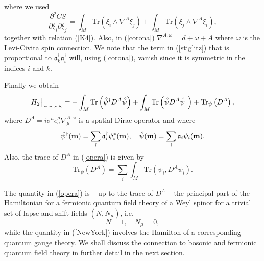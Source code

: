 \documentclass[12pt]{article}
\def\m{\mu}
\def\n{\nu}
\def\oo{\omega}
\newcommand{\pa}{\partial}
\begin{document}
where we used 
$$
 \frac{\pa^2 CS}{\pa \xi_{i } \pa \xi_{j }} 
 =    \int_M \mbox{Tr} \left(  \xi_{i  }  \wedge \nabla^A  \xi_{j} \right) + \int_M \mbox{Tr} \left(  \xi_{j  }  \wedge \nabla^A  \xi_{i} \right)   ,   
$$
together with relation (\ref{K4}). Also, in (\ref{corona}) $\nabla^{A,\oo}= d+\oo + A$ where $\oo$ is the Levi-Civita spin connection. %
We note that the term in (\ref{stiglitz}) that is proportional to $ \mathfrak{a}^\dagger_k \mathfrak{a}^\dagger_i $ will, using (\ref{corona}), vanish since it is symmetric in the indices $i$ and $k$. 





Finally we obtain  
\begin{equation}
H_2\big\vert_{\mbox{\tiny fermionic}} =   -\int_M  \mbox{Tr} \left(  \hat{\psi}^\dagger D^A \hat{\psi}\right)  + \int_M  \mbox{Tr} \left(  \hat{\psi}   D^A \hat{\psi}^\dagger\right) +  \mbox{Tr}_\psi\left( D^A  \right) ,
\label{opera}
\end{equation}
where $D^A= i \sigma^a e_a^\m \nabla_\m^{A,\oo}$ is a spatial Dirac operator and where
\begin{equation}
\hat{\psi}^\dagger  ({\bf m})  = \sum_i \mathfrak{a}_i^\dagger {\psi}^*_i  ({\bf m})  , \quad \hat{\psi} ({\bf m}) = \sum_i \mathfrak{a}_i \psi_i  ({\bf m}) .
\label{faber}
\end{equation}
Also, the trace of $D^A$ in (\ref{opera}) is given by
\begin{equation}
\mbox{Tr}_\psi \left( D^A  \right) = \sum_i \int_M  \mbox{Tr} \left(  {\psi}_i ,  D^A {\psi}_i\right) .
\label{bbbb}
\end{equation}

 The quantity in (\ref{opera}) is -- up to the trace of $D^A$ -- the principal part of the Hamiltonian for a fermionic quantum field theory of a Weyl spinor \cite{Paschke} for a trivial set of lapse and shift fields $(N,N_\m)$, i.e. $$N=1,\quad N_\m=0,$$ while the quantity in (\ref{NewYork}) involves the Hamilton of a corresponding quantum gauge theory. We shall discuss the connection to bosonic and fermionic quantum field theory in further detail in the next section. 
\end{document}
